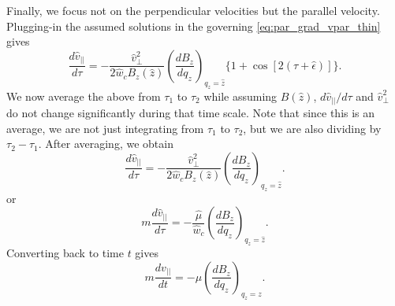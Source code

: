 \documentclass[a4paper,11pt]{report}
\begin{document}
Finally, we focus not on the perpendicular velocities but the parallel velocity. Plugging-in the assumed solutions in the governing \cref{eq:par_grad_vpar_thin} gives
\begin{equation}
    \frac{d\hat{v}_{||}}{d\tau} = -\frac{\hat{v}^2_{\perp}}{2\hat{w}_c B_z(\hat{z})} \left ( \frac{dB_z}{dq_z} \right )_{q_z = \hat{z}} \{ 1 + \cos [2(\tau + \hat{\epsilon})] \}.
\end{equation}
We now average the above from $\tau_1$ to $\tau_2$ while assuming $B(\hat{z})$, $d\hat{v}_{||}/d\tau$ and $\hat{v}^2_\perp$ do not change significantly during that time scale. Note that since this is an average, we are not just integrating from $\tau_1$ to $\tau_2$, but we are also dividing by $\tau_2 - \tau_1$. After  averaging, we obtain
\begin{equation}
    \frac{d\hat{v}_{||}}{d\tau} = -\frac{\hat{v}^2_{\perp}}{2\hat{w}_c B_z(\hat{z})} \left ( \frac{dB_z}{dq_z} \right )_{q_z = \hat{z}} .
\end{equation}
or
\begin{equation}
    m \frac{d\hat{v}_{||}}{d\tau} = -\frac{\hat{\mu}}{\hat{w}_c} \left ( \frac{dB_z}{dq_z} \right )_{q_z = \hat{z}} .
\end{equation}
Converting back to time $t$ gives
\begin{equation}
    m \frac{dv_{||}}{dt} = -\mu \left ( \frac{dB_z}{dq_z} \right )_{q_z = z} .
\end{equation}

\end{document}
